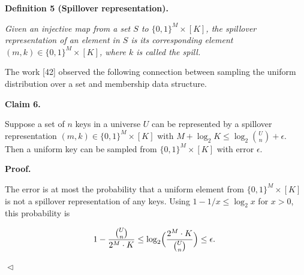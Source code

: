 

\par\medskip\noindent\textbf{
\textbf{Definition 5}\textbf{ }(Spillover representation)\textbf{.}
}\par



\emph{Given an injective map from a set $S$ to $\{0,1\}^{M}\times[K]$, the spillover representation of an element in $S$ is its corresponding element $(m,k)\in\{0,1\}^{M}\times[K]$, where $k$ is called the spill.}\par






The work [42] observed the following connection between sampling the uniform distribution over a set and membership data structure.\par





\par\medskip\noindent\textbf{
Claim 6. 
}\par



Suppose a set of $n$ keys in a universe $U$ can be represented by a spillover representation $(m,k)\in\{0,1\}^{M}\times[K]$ with
$M+\log_{2}K\leq\log_{2}\binom{U}{n}+\epsilon$.
Then a uniform key can be sampled from $\{0,1\}^{M}\times[K]$ with error $\epsilon$.\par






\par\medskip\noindent\textbf{
\textbf{Proof}.}\par




The error is at most the probability that a uniform element from $\{0,1\}^{M}\times[K]$ is not a spillover representation of any keys.
Using $1-1/x\leq\log_{2}x$ for $x>0$, this probability is\par


\[\begin{gathered}
1-\frac{\binom{U}{n}}{2^{M}\cdot K}\leq\log_{2}\Bigl(\frac{2^{M}\cdot K}{\binom{U}{n}}\Bigr)\leq\epsilon.\
\end{gathered}\]


$\vartriangleleft$\par




